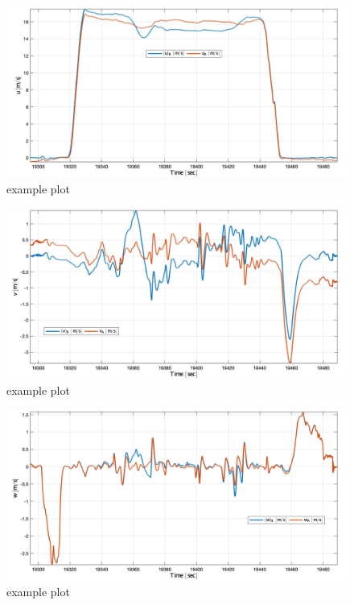 \documentclass[11pt,a4paper]{article}
\begin{document}

\begin{figure}[!ht]
\center
\includegraphics[width=\textwidth]{img/EKF_Wind_8}
\caption{example plot}
\label{flowchart}
\end{figure}

\begin{figure}[!ht]
\center
\includegraphics[width=\textwidth]{img/EKF_Wind_9}
\caption{example plot}
\label{flowchart}
\end{figure}

\begin{figure}[!ht]
\center
\includegraphics[width=\textwidth]{img/EKF_Wind_10}
\caption{example plot}
\label{flowchart}
\end{figure}
\end{document}

